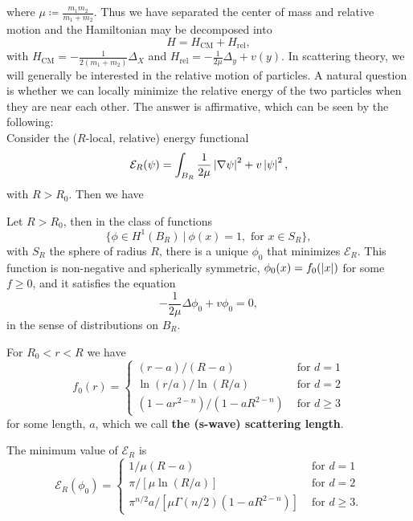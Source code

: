 where $ \mu\coloneqq \frac{m_1m_2}{m_1+m_2} $. Thus we have separated the center of mass and relative motion and the Hamiltonian may be decomposed into \begin{equation}
H=H_{\text{CM}}+H_{\text{rel}},
\end{equation}
with $ H_{\text{CM}}=-\frac{1}{2(m_1+m_2)}\Delta_X $ and $ H_{\text{rel}}=-\frac{1}{2\mu}\Delta_y+v(y) $. In scattering theory, we will generally be interested in the relative motion of particles. A natural question is whether we can locally minimize the relative energy of the two particles when they are near each other. The answer is affirmative, which can be seen by the following:\\
Consider the ($ R $-local, relative) energy functional \begin{equation}
\mathcal{E}_R(\psi)=\int_{B_R} \frac{1}{2\mu}\left\lvert \nabla\psi \right\rvert^2+v\left\lvert \psi \right\rvert^2,
\end{equation}
with $ R>R_0 $. Then we have 
\begin{theorem}\label{TheoremScatteringLength}
	Let $ R>R_0 $, then in the class of functions 
	$$ \{\phi\in H^1(B_R)\ \vert\ \phi(x)=1,\text{ for }x\in S_R\}, $$ with $ S_R $ the sphere of radius $ R $,
	there is a unique $ \phi_0 $ that minimizes $ \mathcal{E}_R $. This function is non-negative and spherically symmetric, $ \phi_0(x)=f_0(\left\lvert x \right\rvert) $ for some $ f\geq 0 $, and it satisfies the equation\begin{equation}\label{EqScatteringEquation: d Dimensions}
	-\frac{1}{2\mu}\Delta\phi_0+v\phi_0=0,
	\end{equation}
	in the sense of distributions on $ B_R $.
	
	For $ R_0<r<R $ we have \begin{equation}
	f_0(r)=\begin{cases}
	(r-a)/(R-a)&\text{ for }d=1\\
	\ln(r/a)/\ln(R/a)& \text{ for }d=2\\
	(1-ar^{2-n})/(1-aR^{2-n})& \text{ for }d\geq3
	\end{cases}
	\end{equation}
	for some length, $ a $, which we call \textbf{the (s-wave) scattering length}.
	
	The minimum value of $ \mathcal{E}_R $ is 
	\begin{equation}
	\mathcal{E}_{R}(\phi_0)=\begin{cases}
	1/\mu(R-a)&\text{ for }d=1\\
	\pi/[\mu\ln(R/a)]& \text{ for }d=2\\
	\pi^{n/2}a/[\mu\Gamma(n/2)(1-aR^{2-n})]& \text{ for }d\geq3.
	\end{cases}
	\end{equation}
\end{theorem}
